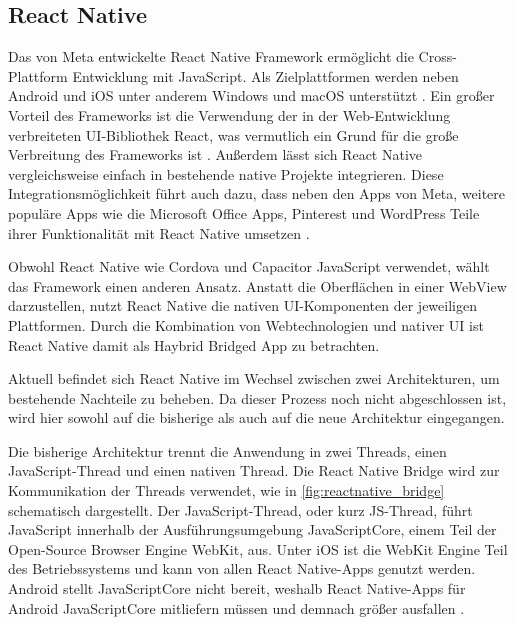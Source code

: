 \subsection{React Native}
\label{sec:Frameorks_ReactNative}

Das von Meta entwickelte React Native Framework ermöglicht die Cross-Plattform Entwicklung mit JavaScript.
Als Zielplattformen werden neben Android und iOS unter anderem Windows und macOS unterstützt \cite{ReactNative}.
Ein großer Vorteil des Frameworks ist die Verwendung der in der Web-Entwicklung verbreiteten \ac{UI}-Bibliothek React, was vermutlich ein Grund für die große Verbreitung des Frameworks ist \cite{Appfigures_TopSDKs,Stackoverflow_2022}.
Außerdem lässt sich React Native vergleichsweise einfach in bestehende native Projekte integrieren.
Diese Integrationsmöglichkeit führt auch dazu, dass neben den Apps von Meta, weitere populäre Apps wie die Microsoft Office Apps, Pinterest und WordPress Teile ihrer Funktionalität mit React Native umsetzen \cite{ReactNative_Showcase}.


Obwohl React Native wie Cordova und Capacitor JavaScript verwendet, wählt das Framework einen anderen Ansatz.
Anstatt die Oberflächen in einer WebView darzustellen, nutzt React Native die nativen \ac{UI}-Komponenten der jeweiligen Plattformen.
Durch die Kombination von Webtechnologien und nativer \ac{UI} ist React Native damit als Haybrid Bridged App zu betrachten.


Aktuell befindet sich React Native im Wechsel zwischen zwei Architekturen, um bestehende Nachteile zu beheben.
Da dieser Prozess noch nicht abgeschlossen ist, wird hier sowohl auf die bisherige als auch auf die neue Architektur eingegangen.


Die bisherige Architektur trennt die Anwendung in zwei Threads, einen JavaScript-Thread und einen nativen Thread.
Die React Native Bridge wird zur Kommunikation der Threads verwendet, wie in \autoref{fig:reactnative_bridge} schematisch dargestellt.
Der JavaScript-Thread, oder kurz JS-Thread, führt JavaScript innerhalb der Ausführungsumgebung JavaScriptCore, einem Teil der Open-Source Browser Engine WebKit, aus.
Unter iOS ist die WebKit Engine Teil des Betriebssystems und kann von allen React Native-Apps genutzt werden.
Android stellt JavaScriptCore nicht bereit, weshalb React Native-Apps für Android JavaScriptCore mitliefern müssen und demnach größer ausfallen \cite{Dragomir_ReactNative,Nawrocki_Comparison_Hybrid_Native_Frameworks}.

